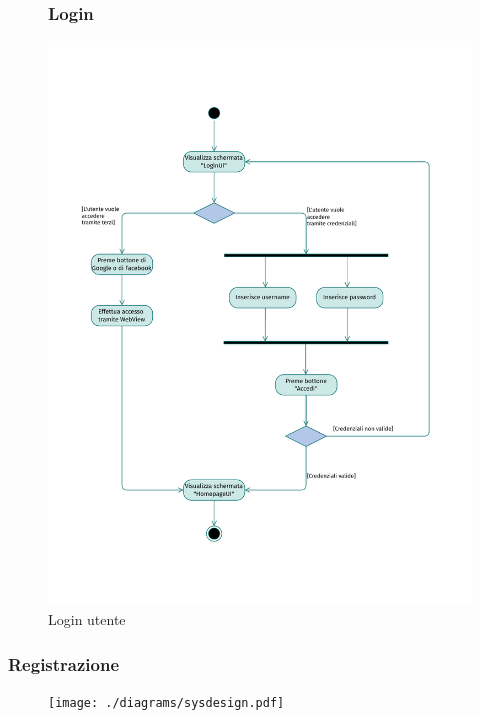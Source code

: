 \documentclass{natourDoc}
\begin{document}
\begin{figure}[!htbp]
	\subsubsection{Login}
	\centering
	\includegraphics[width=\textwidth, page=1]{./diagrams/activity.pdf}
	\caption{Login utente}
\end{figure}
\FloatBarrier

\newpage
\subsubsection{Registrazione}

\begin{figure}[!htbp]
	\centering
	\texttt{[image: ./diagrams/sysdesign.pdf]}
\end{figure}
\end{document}
